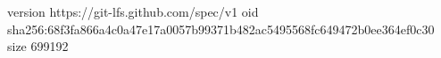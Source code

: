 version https://git-lfs.github.com/spec/v1
oid sha256:68f3fa866a4c0a47e17a0057b99371b482ac5495568fc649472b0ee364ef0c30
size 699192
